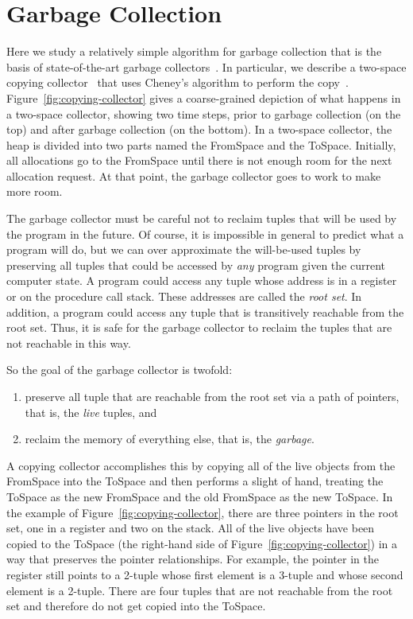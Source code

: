 \documentclass[11pt]{book}
\begin{document}
\section{Garbage Collection}
\label{sec:GC}

Here we study a relatively simple algorithm for garbage collection
that is the basis of state-of-the-art garbage
collectors~\citep{Lieberman:1983aa,Ungar:1984aa,Jones:1996aa,Detlefs:2004aa,Dybvig:2006aa,Tene:2011kx}. In
particular, we describe a two-space copying
collector~\citep{Wilson:1992fk} that uses Cheney's algorithm to
perform the
copy~\citep{Cheney:1970aa}.
Figure~\ref{fig:copying-collector} gives a
coarse-grained depiction of what happens in a two-space collector,
showing two time steps, prior to garbage collection (on the top) and
after garbage collection (on the bottom). In a two-space collector,
the heap is divided into two parts named the FromSpace and the
ToSpace. Initially, all allocations go to the FromSpace until there is
not enough room for the next allocation request. At that point, the
garbage collector goes to work to make more room.

The garbage collector must be careful not to reclaim tuples that will
be used by the program in the future. Of course, it is impossible in
general to predict what a program will do, but we can over approximate
the will-be-used tuples by preserving all tuples that could be
accessed by \emph{any} program given the current computer state.  A
program could access any tuple whose address is in a register or on
the procedure call stack. These addresses are called the \emph{root
  set}. In addition, a program could access any tuple that is
transitively reachable from the root set. Thus, it is safe for the
garbage collector to reclaim the tuples that are not reachable in this
way.

So the goal of the garbage collector is twofold:
\begin{enumerate}
\item preserve all tuple that are reachable from the root set via a
  path of pointers, that is, the \emph{live} tuples, and
\item reclaim the memory of everything else, that is, the
  \emph{garbage}.
\end{enumerate}
A copying collector accomplishes this by copying all of the live
objects from the FromSpace into the ToSpace and then performs a slight
of hand, treating the ToSpace as the new FromSpace and the old
FromSpace as the new ToSpace.  In the example of
Figure~\ref{fig:copying-collector}, there are three pointers in the
root set, one in a register and two on the stack.  All of the live
objects have been copied to the ToSpace (the right-hand side of
Figure~\ref{fig:copying-collector}) in a way that preserves the
pointer relationships. For example, the pointer in the register still
points to a 2-tuple whose first element is a 3-tuple and whose second
element is a 2-tuple.  There are four tuples that are not reachable
from the root set and therefore do not get copied into the ToSpace.
\end{document}
